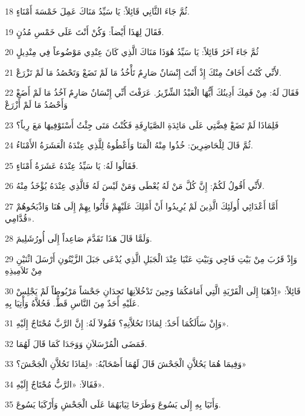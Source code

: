 \par 18 ثُمَّ جَاءَ الثَّانِي قَائِلاً: يَا سَيِّدُ مَنَاكَ عَمِلَ خَمْسَةَ أَمْنَاءٍ.
\par 19 فَقَالَ لِهَذَا أَيْضاً: وَكُنْ أَنْتَ عَلَى خَمْسِ مُدُنٍ.
\par 20 ثُمَّ جَاءَ آخَرُ قَائِلاً: يَا سَيِّدُ هُوَذَا مَنَاكَ الَّذِي كَانَ عِنْدِي مَوْضُوعاً فِي مِنْدِيلٍ
\par 21 لأَنِّي كُنْتُ أَخَافُ مِنْكَ إِذْ أَنْتَ إِنْسَانٌ صَارِمٌ تَأْخُذُ مَا لَمْ تَضَعْ وَتَحْصُدُ مَا لَمْ تَزْرَعْ.
\par 22 فَقَالَ لَهُ: مِنْ فَمِكَ أَدِينُكَ أَيُّهَا الْعَبْدُ الشِّرِّيرُ. عَرَفْتَ أَنِّي إِنْسَانٌ صَارِمٌ آخُذُ مَا لَمْ أَضَعْ وَأَحْصُدُ مَا لَمْ أَزْرَعْ
\par 23 فَلِمَاذَا لَمْ تَضَعْ فِضَّتِي عَلَى مَائِدَةِ الصَّيَارِفَةِ فَكُنْتُ مَتَى جِئْتُ أَسْتَوْفِيهَا مَعَ رِباً؟
\par 24 ثُمَّ قَالَ لِلْحَاضِرِينَ: خُذُوا مِنْهُ الْمَنَا وَأَعْطُوهُ لِلَّذِي عِنْدَهُ الْعَشَرَةُ الأَمْنَاءُ.
\par 25 فَقَالُوا لَهُ: يَا سَيِّدُ عِنْدَهُ عَشَرَةُ أَمْنَاءٍ.
\par 26 لأَنِّي أَقُولُ لَكُمْ: إِنَّ كُلَّ مَنْ لَهُ يُعْطَى وَمَنْ لَيْسَ لَهُ فَالَّذِي عِنْدَهُ يُؤْخَذُ مِنْهُ.
\par 27 أَمَّا أَعْدَائِي أُولَئِكَ الَّذِينَ لَمْ يُرِيدُوا أَنْ أَمْلِكَ عَلَيْهِمْ فَأْتُوا بِهِمْ إِلَى هُنَا وَاذْبَحُوهُمْ قُدَّامِي».
\par 28 وَلَمَّا قَالَ هَذَا تَقَدَّمَ صَاعِداً إِلَى أُورُشَلِيمَ.
\par 29 وَإِذْ قَرُبَ مِنْ بَيْتِ فَاجِي وَبَيْتِ عَنْيَا عِنْدَ الْجَبَلِ الَّذِي يُدْعَى جَبَلَ الزَّيْتُونِ أَرْسَلَ اثْنَيْنِ مِنْ تَلاَمِيذِهِ
\par 30 قَائِلاً: «اِذْهَبَا إِلَى الْقَرْيَةِ الَّتِي أَمَامَكُمَا وَحِينَ تَدْخُلاَنِهَا تَجِدَانِ جَحْشاً مَرْبُوطاً لَمْ يَجْلِسْ عَلَيْهِ أَحَدٌ مِنَ النَّاسِ قَطُّ. فَحُلاَّهُ وَأْتِيَا بِهِ.
\par 31 وَإِنْ سَأَلَكُمَا أَحَدٌ: لِمَاذَا تَحُلاَّنِهِ؟ فَقُولاَ لَهُ: إِنَّ الرَّبَّ مُحْتَاجٌ إِلَيْهِ».
\par 32 فَمَضَى الْمُرْسَلاَنِ وَوَجَدَا كَمَا قَالَ لَهُمَا.
\par 33 وَفِيمَا هُمَا يَحُلاَّنِ الْجَحْشَ قَالَ لَهُمَا أَصْحَابُهُ: «لِمَاذَا تَحُلاَّنِ الْجَحْشَ؟»
\par 34 فَقَالاَ: «الرَّبُّ مُحْتَاجٌ إِلَيْهِ».
\par 35 وَأَتَيَا بِهِ إِلَى يَسُوعَ وَطَرَحَا ثِيَابَهُمَا عَلَى الْجَحْشِ وَأَرْكَبَا يَسُوعَ.
